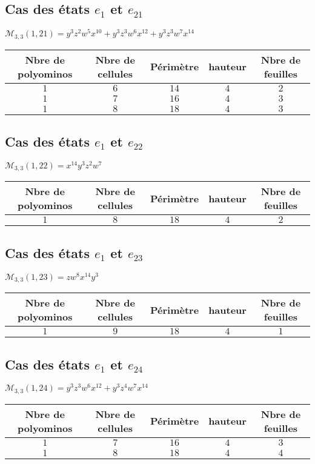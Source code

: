 \documentclass[12pt]{memoireuqam1.3}
\begin{document}
\subsection*{Cas des états $e_{1}$ et $e_{21}$ }
$\mathcal{M}_{3,3}(1,21)=y^3z^2w^5x^{10}+y^3z^3w^6x^{12}+y^3z^3w^7x^{14}$\\
\begin{tabular}{|c|c|c|c|c|}
 \hline
  Nbre de polyominos & Nbre de cellules & Périmètre & hauteur &Nbre de feuilles\\
 \hline
 $1$ & $6$ & $14$ & $4$ &$2$\\
 \hline
 $1$ & $7$ & $16$ & $4$ &$3$\\
 \hline
  $1$ & $8$ & $18$ & $4$ &$3$\\
 \hline
\end{tabular}
\subsection*{Cas des états $e_{1}$ et $e_{22}$ }
$\mathcal{M}_{3,3}(1,22)=x^{14}y^3z^2w^7$\\
\begin{tabular}{|c|c|c|c|c|}
 \hline
  Nbre de polyominos & Nbre de cellules & Périmètre & hauteur &Nbre de feuilles\\
 \hline
 $1$ & $8$ & $18$ & $4$ &$2$\\
 \hline
\end{tabular}
\subsection*{Cas des états $e_{1}$ et $e_{23}$ }
$\mathcal{M}_{3,3}(1,23)=zw^8x^{14}y^3
$\\
\begin{tabular}{|c|c|c|c|c|}
 \hline
  Nbre de polyominos & Nbre de cellules & Périmètre & hauteur &Nbre de feuilles\\
 \hline
 $1$ & $9$ & $18$ & $4$ &$1$\\
 \hline
\end{tabular}
\subsection*{Cas des états $e_{1}$ et $e_{24}$ }
$\mathcal{M}_{3,3}(1,24)=y^3z^3w^6x^{12}+y^3z^4w^7x^{14}
$\\
\begin{tabular}{|c|c|c|c|c|}
 \hline
  Nbre de polyominos & Nbre de cellules & Périmètre & hauteur &Nbre de feuilles\\
 \hline
 $1$ & $7$ & $16$ & $4$ &$3$\\
 \hline
 $1$ & $8$ & $18$ & $4$ &$4$\\
 \hline
\end{tabular}
\end{document}
